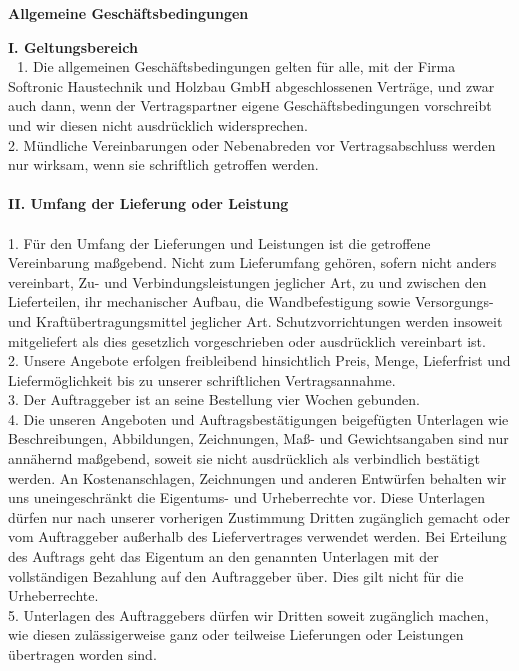 \documentclass[9pt, oneside]{extletter}
\begin{document}
\large
\begin{center}\textbf{Allgemeine Geschäftsbedingungen}\end{center}

\begin{multicols}{3}
\fontsize{7.6}{8.6}
\selectfont
\textbf{I. Geltungsbereich}\\ 
1. Die allgemeinen Geschäftsbedingungen gelten für alle, mit der Firma Softronic Haustechnik und Holzbau GmbH abgeschlossenen Verträge, und zwar auch dann, wenn der Vertragspartner eigene Geschäftsbedingungen vorschreibt und wir diesen nicht ausdrücklich widersprechen.\\
2. Mündliche Vereinbarungen oder Nebenabreden vor Vertragsabschluss werden nur wirksam, wenn sie schriftlich getroffen werden.\\
\\
\textbf{II. Umfang der Lieferung oder Leistung}\\
\\
1. Für den Umfang der Lieferungen und Leistungen ist die getroffene Vereinbarung maßgebend. Nicht zum Lieferumfang gehören, sofern nicht anders vereinbart, Zu- und Verbindungsleistungen jeglicher Art, zu und zwischen den Lieferteilen, ihr mechanischer Aufbau, die Wandbefestigung sowie Versorgungs- und Kraftübertragungsmittel jeglicher Art. Schutzvorrichtungen werden insoweit mitgeliefert als dies gesetzlich vorgeschrieben oder ausdrücklich vereinbart ist.\\
2. Unsere Angebote erfolgen freibleibend hinsichtlich Preis, Menge, Lieferfrist und Liefermöglichkeit bis zu unserer schriftlichen Vertragsannahme.\\
3. Der Auftraggeber ist an seine Bestellung vier Wochen gebunden.\\
4. Die unseren Angeboten und Auftragsbestätigungen beigefügten Unterlagen wie Beschreibungen, Abbildungen, Zeichnungen, Maß- und Gewichtsangaben sind nur annähernd maßgebend, soweit sie nicht ausdrücklich als verbindlich bestätigt werden. An Kostenanschlagen, Zeichnungen und anderen Entwürfen behalten wir uns uneingeschränkt die Eigentums- und Urheberrechte vor. Diese Unterlagen dürfen nur nach unserer vorherigen Zustimmung Dritten zugänglich gemacht oder vom Auftraggeber außerhalb des Liefervertrages verwendet werden. Bei Erteilung des Auftrags geht das Eigentum an den genannten Unterlagen mit der vollständigen Bezahlung auf den Auftraggeber über. Dies gilt nicht für die Urheberrechte.\\
5. Unterlagen des Auftraggebers dürfen wir Dritten soweit zugänglich machen, wie diesen zulässigerweise ganz oder teilweise Lieferungen oder Leistungen übertragen worden sind.\\

\end{multicols}
\end{document}

